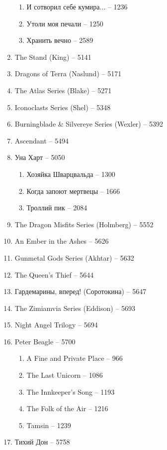\documentclass[a4paper, 11pt]{proc} %
\begin{document}
\begin{enumerate}
        \begin{enumerate}
            \item И сотворил себе кумира... -- 1236
            \item Утоли моя печали -- 1250
            \item Хранить вечно -- 2589
        \end{enumerate}
    \item The Stand (King) -- 5141
    \item Dragons of Terra (Naslund) -- 5171
    \item The Atlas Series (Blake) -- 5271
    \item Iconoclasts Series (Shel) -- 5348
    \item Burningblade \& Silvereye Series (Wexler) -- 5392
    \item Ascendant -- 5494
    \item Уна Харт -- 5050
        \begin{enumerate}
            \item Хозяйка Шварцвальда -- 1300  
            \item Когда запоют мертвецы -- 1666
            \item Троллий пик -- 2084
        \end{enumerate}
    \item The Dragon Misfits Series (Holmberg) -- 5552
    \item An Ember in the Ashes -- 5626
    \item Gunmetal Gods Series (Akhtar) -- 5632
    \item The Queen's Thief -- 5644
    \item Гардемарины, вперед! (Соротокина) -- 5647
    \item The Zimiamvia Series (Eddison) -- 5693
    \item Night Angel Trilogy -- 5694
    \item Peter Beagle -- 5700
        \begin{enumerate}
            \item A Fine and Private Place -- 966
            \item The Last Unicorn -- 1086
            \item The Innkeeper's Song -- 1193
            \item The Folk of the Air -- 1216
            \item Tamsin -- 1239
        \end{enumerate}
    \item Тихий Дон -- 5758

\end{enumerate}
\end{document}
